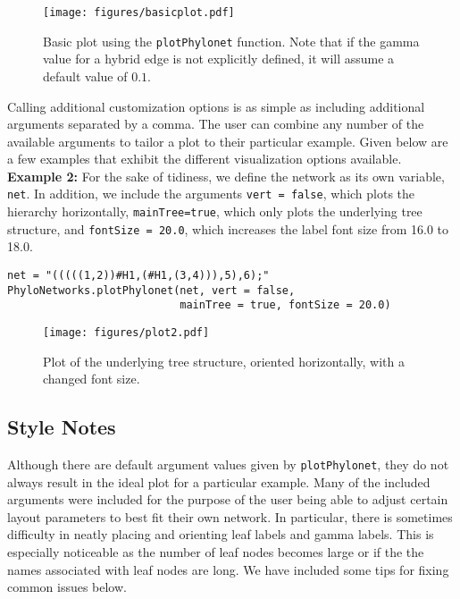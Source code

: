 \documentclass[12pt]{article}
\begin{document}
\begin{figure}[htbp]
  \begin{center}
    \texttt{[image: figures/basicplot.pdf]} \quad
    \caption{Basic plot using the \texttt{plotPhylonet} function. Note that if the gamma value for a hybrid edge is not explicitly defined, it will assume a default value of $0.1$.}
    \label{BasicPlot}
  \end{center}
\end{figure}

\noindent Calling additional customization options is as simple as including additional arguments separated by a comma.
The user can combine any number of the available arguments to tailor a plot to their particular example.
Given below are a few examples that exhibit the different visualization options available. \\

\noindent \textbf{Example 2:} For the sake of tidiness, we define the network  as its own variable, \texttt{net}.
In addition, we include the arguments \texttt{vert = false}, which plots the hierarchy horizontally,
\texttt{mainTree=true}, which only plots the underlying tree structure, and
\texttt{fontSize = 20.0}, which increases the label font size from 16.0 to 18.0. \\

\begin{lstlisting}
net = "(((((1,2))#H1,(#H1,(3,4))),5),6);"
PhyloNetworks.plotPhylonet(net, vert = false,
                           mainTree = true, fontSize = 20.0)
\end{lstlisting}

\begin{figure}[htbp]
  \begin{center}
    \texttt{[image: figures/plot2.pdf]} \quad
    \caption{Plot of the underlying tree structure, oriented horizontally, with a changed font size.}
    \label{BasicPlot}
  \end{center}
\end{figure}


\subsection{Style Notes}
Although there are default argument values given by \texttt{plotPhylonet}, they do not always result in the ideal plot for a particular example.
Many of the included arguments were included for the purpose of the user being able to adjust certain layout parameters to best fit their own network.
In particular, there is sometimes difficulty in neatly placing and orienting leaf labels and gamma labels.
This is especially noticeable as the number of leaf nodes becomes large or if the the names associated with leaf nodes are long.
We have included some tips for fixing common issues below.
\end{document}
